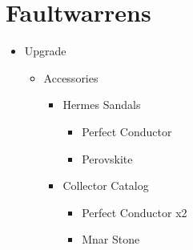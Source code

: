 \chapter{Faultwarrens}

\begin{upgrade}
	\begin{itemize}
		\item Upgrade
			\begin{itemize}
				\item Accessories
					\begin{itemize}
						\item Hermes Sandals
							\begin{itemize}
								\item Perfect Conductor
								\item Perovskite
							\end{itemize}
						\item Collector Catalog
							\begin{itemize}
								\item Perfect Conductor x2
								\item Mnar Stone
							\end{itemize}
					\end{itemize}
			\end{itemize}
	\end{itemize}
\end{upgrade}
\vfill
